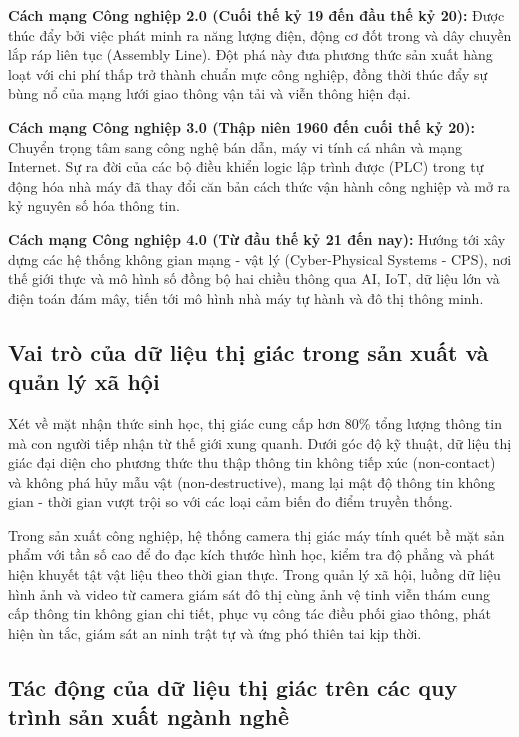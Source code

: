 \textbf{Cách mạng Công nghiệp 2.0 (Cuối thế kỷ 19 đến đầu thế kỷ 20):} Được thúc đẩy bởi việc phát minh ra năng lượng điện, động cơ đốt trong và dây chuyền lắp ráp liên tục (Assembly Line). Đột phá này đưa phương thức sản xuất hàng loạt với chi phí thấp trở thành chuẩn mực công nghiệp, đồng thời thúc đẩy sự bùng nổ của mạng lưới giao thông vận tải và viễn thông hiện đại.

\textbf{Cách mạng Công nghiệp 3.0 (Thập niên 1960 đến cuối thế kỷ 20):} Chuyển trọng tâm sang công nghệ bán dẫn, máy vi tính cá nhân và mạng Internet. Sự ra đời của các bộ điều khiển logic lập trình được (PLC) trong tự động hóa nhà máy đã thay đổi căn bản cách thức vận hành công nghiệp và mở ra kỷ nguyên số hóa thông tin.

\textbf{Cách mạng Công nghiệp 4.0 (Từ đầu thế kỷ 21 đến nay):} Hướng tới xây dựng các hệ thống không gian mạng - vật lý (Cyber-Physical Systems - CPS), nơi thế giới thực và mô hình số đồng bộ hai chiều thông qua AI, IoT, dữ liệu lớn và điện toán đám mây, tiến tới mô hình nhà máy tự hành và đô thị thông minh.

\subsection{Vai trò của dữ liệu thị giác trong sản xuất và quản lý xã hội}

Xét về mặt nhận thức sinh học, thị giác cung cấp hơn 80\% tổng lượng thông tin mà con người tiếp nhận từ thế giới xung quanh. Dưới góc độ kỹ thuật, dữ liệu thị giác đại diện cho phương thức thu thập thông tin không tiếp xúc (non-contact) và không phá hủy mẫu vật (non-destructive), mang lại mật độ thông tin không gian - thời gian vượt trội so với các loại cảm biến đo điểm truyền thống.

Trong sản xuất công nghiệp, hệ thống camera thị giác máy tính quét bề mặt sản phẩm với tần số cao để đo đạc kích thước hình học, kiểm tra độ phẳng và phát hiện khuyết tật vật liệu theo thời gian thực. Trong quản lý xã hội, luồng dữ liệu hình ảnh và video từ camera giám sát đô thị cùng ảnh vệ tinh viễn thám cung cấp thông tin không gian chi tiết, phục vụ công tác điều phối giao thông, phát hiện ùn tắc, giám sát an ninh trật tự và ứng phó thiên tai kịp thời.

\subsection{Tác động của dữ liệu thị giác trên các quy trình sản xuất ngành nghề}

